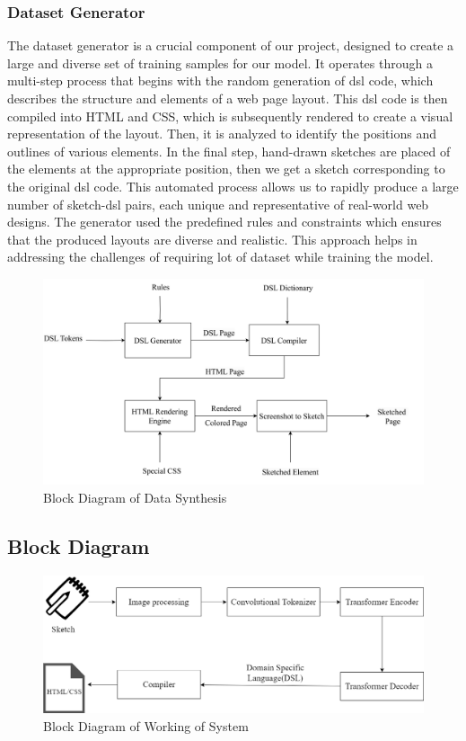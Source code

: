 \documentclass{ioereport}
\begin{document}
\subsubsection{Dataset Generator}
The dataset generator is a crucial component of our project, designed to create a large
and diverse set of training samples for our model. It operates through a multi-step
process that begins with the random generation of \gls{dsl}
code, which describes the structure and elements of a web page layout. This \gls{dsl} code
is then compiled into HTML and CSS, which is subsequently rendered to create a visual
representation of the layout. Then, it is analyzed to identify the positions and outlines
of various elements. In the final step, hand-drawn sketches are placed of the elements
at the appropriate position, then we get a sketch corresponding to the original \gls{dsl} code.
This automated process allows us to rapidly produce a large number of sketch-\gls{dsl}
pairs, each unique and representative of real-world web designs. The generator used the
predefined rules and constraints which ensures that the produced layouts are diverse
and realistic. This approach helps in addressing the challenges of requiring lot of dataset
while training the model.
\begin{figure}[H]
    \centering
    \includegraphics[width=\textwidth]{images/Dataset Generator.png}\caption{Block Diagram of Data Synthesis}\label{fig:Synthesis}
\end{figure}



    \subsection{Block Diagram}

 \begin{figure}[H]
        \includegraphics[scale=5]{images/Block Diagram.png}
        \caption{Block Diagram of Working of System}
        \label{fig:block}
    \end{figure}
\end{document}
